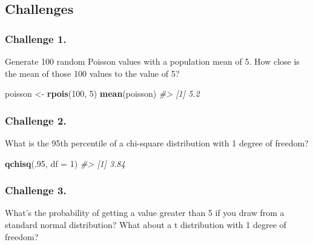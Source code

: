 \documentclass[]{book}
\newenvironment{Shaded}{\begin{snugshade}}{\end{snugshade}}
\newcommand{\CommentTok}[1]{\textcolor[rgb]{0.56,0.35,0.01}{\textit{#1}}}
\newcommand{\DataTypeTok}[1]{\textcolor[rgb]{0.13,0.29,0.53}{#1}}
\newcommand{\DecValTok}[1]{\textcolor[rgb]{0.00,0.00,0.81}{#1}}
\newcommand{\KeywordTok}[1]{\textcolor[rgb]{0.13,0.29,0.53}{\textbf{#1}}}
\newcommand{\NormalTok}[1]{#1}
\newcommand{\StringTok}[1]{\textcolor[rgb]{0.31,0.60,0.02}{#1}}
\begin{document}
\hypertarget{challenges-13}{%
\subsection{Challenges}\label{challenges-13}}

\hypertarget{challenge-1.-9}{%
\subsubsection*{Challenge 1.}\label{challenge-1.-9}}

Generate 100 random Poisson values with a population mean of 5. How close is the mean of those 100 values to the value of 5?

\begin{Shaded}
\begin{Highlighting}[]
\NormalTok{poisson <-}\StringTok{ }\KeywordTok{rpois}\NormalTok{(}\DecValTok{100}\NormalTok{, }\DecValTok{5}\NormalTok{)}
\KeywordTok{mean}\NormalTok{(poisson)}
\CommentTok{#> [1] 5.2}
\end{Highlighting}
\end{Shaded}

\hypertarget{challenge-2.-9}{%
\subsubsection*{Challenge 2.}\label{challenge-2.-9}}

What is the 95th percentile of a chi-square distribution with 1 degree of freedom?

\begin{Shaded}
\begin{Highlighting}[]
\KeywordTok{qchisq}\NormalTok{(.}\DecValTok{95}\NormalTok{, }\DataTypeTok{df =} \DecValTok{1}\NormalTok{)}
\CommentTok{#> [1] 3.84}
\end{Highlighting}
\end{Shaded}

\hypertarget{challenge-3.-6}{%
\subsubsection*{Challenge 3.}\label{challenge-3.-6}}

What's the probability of getting a value greater than 5 if you draw from a standard normal distribution? What about a t distribution with 1 degree of freedom?
\end{document}
